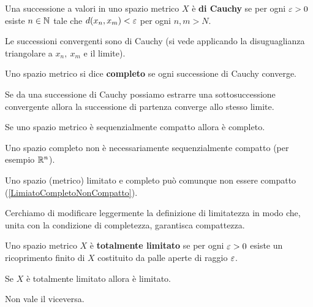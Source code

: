 \begin{multicols*}{2}
\begin{definition}
Una successione a valori in uno spazio metrico $X$ è \textbf{di Cauchy} se per ogni $\varepsilon>0$ esiste $n\in \mathbb{N}$ tale che $d(x_n,x_m)<\varepsilon$ per ogni $n,m>N$.
\end{definition}
\begin{remark}
Le successioni convergenti sono di Cauchy (si vede applicando la disuguaglianza triangolare a $x_n,\ x_m$ e il limite).
\end{remark}
\begin{definition}
Uno spazio metrico si dice \textbf{completo} se ogni successione di Cauchy converge.
\end{definition}
\begin{proposition}\label{CauchyConSottosuccessioneConvergenteEConvergente}
Se da una successione di Cauchy possiamo estrarre una sottosuccessione convergente allora la successione di partenza converge allo stesso limite.
\end{proposition}
\begin{corollary}\label{MetricoSequenzialmenteCompattoECompleto}
Se uno spazio metrico è sequenzialmente compatto allora è completo.
\end{corollary}
\begin{remark}
Uno spazio completo non è necessariamente sequenzialmente compatto (per esempio $\mathbb{R}^n$).
\end{remark}

\begin{remark}
Uno spazio (metrico) limitato e completo può comunque non essere compatto (\ref{LimiatoCompletoNonCompatto}).
\end{remark}


Cerchiamo di modificare leggermente la definizione di limitatezza in modo che, unita con la condizione di completezza, garantisca compattezza.

\begin{definition}
Uno spazio metrico $X$ è \textbf{totalmente limitato} se per ogni $\varepsilon>0$ esiste un ricoprimento finito di $X$ costituito da palle aperte di raggio $\varepsilon$.
\end{definition}

\begin{proposition}\label{TotalmenteLimitatoImplicaLimitato}
Se $X$ è totalmente limitato allora è limitato.
\end{proposition}
\begin{remark}
Non vale il viceversa.
\end{remark}


\end{multicols*}
